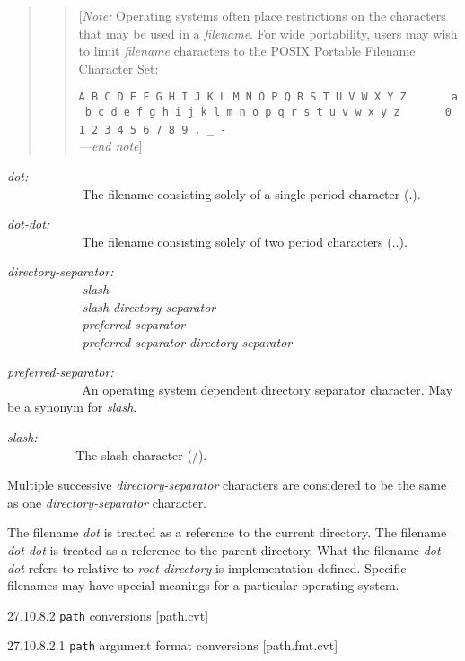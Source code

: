 \begin{quote}
\begin{quote}
{[}\emph{Note:} Operating systems often place restrictions on the
characters that may be used in a \emph{filename}. For wide portability,
users may wish to limit \emph{filename} characters to the POSIX Portable
Filename Character Set:

\texttt{A\ B\ C\ D\ E\ F\ G\ H\ I\ J\ K\ L\ M\ N\ O\ P\ Q\ R\ S\ T\ U\ V\ W\ X\ Y\ Z\ \ \ \ \ \ \ a\ b\ c\ d\ e\ f\ g\ h\ i\ j\ k\ l\ m\ n\ o\ p\ q\ r\ s\ t\ u\ v\ w\ x\ y\ z\ \ \ \ \ \ \ 0\ 1\ 2\ 3\ 4\ 5\ 6\ 7\ 8\ 9\ .\ \_\ -}
\emph{\\[2\baselineskip] ---end note}{]}
\end{quote}
\end{quote}

\emph{dot:\\
 ~~~~~~~~~~~} The filename consisting solely of a single period
character (.).

\emph{dot-dot:\\
 ~~~~~~~~~~~} The filename consisting solely of two period characters
(..).

\emph{directory-separator:\\
 ~~~~~~~~~~~ slash\\
 ~~~~~~~~~~~ slash directory-separator\\
 ~~~~~~~~~~~ preferred-separator\\
 ~~~~~~~~~~~ preferred-separator directory-separator}

\emph{preferred-separator:\\
 ~~~~~~~~~~~} An operating system dependent directory separator
character. May be a synonym for \emph{slash}.

\emph{slash:\\
 ~~~~~~~~~~} The slash character (/).

Multiple successive \emph{directory-separator} characters are considered
to be the same as one \emph{directory-separator} character.

The filename \emph{dot} is treated as a reference to the current
directory. The filename \emph{dot-dot} is treated as a reference to the
parent directory. What the filename \emph{dot-dot} refers to relative to
\emph{root-directory} is implementation-defined. Specific filenames may
have special meanings for a particular operating system.

27.10.8.2 \texttt{path} conversions {[}path.cvt{]}

27.10.8.2.1 \texttt{path} argument format conversions {[}path.fmt.cvt{]}

